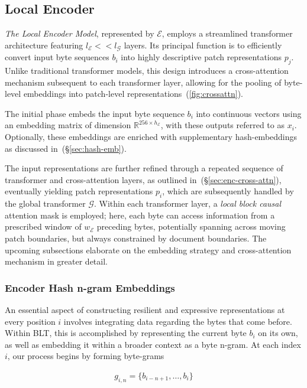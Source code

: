 \subsection{Local Encoder}
\label{section:local}

\textit{The Local Encoder Model}, represented by $\mathcal{E}$, employs a streamlined transformer architecture featuring $l_{\mathcal{E}} << l_{\mathcal{G}}$ layers. Its principal function is to efficiently convert input byte sequences $b_i$ into highly descriptive patch representations $p_j$. Unlike traditional transformer models, this design introduces a cross-attention mechanism subsequent to each transformer layer, allowing for the pooling of byte-level embeddings into patch-level representations~(\autoref{fig:crossattn}).

The initial phase embeds the input byte sequence $b_i$ into continuous vectors using an embedding matrix of dimension $\mathbb{R}^{256 \times h_{\mathcal{E}}}$, with these outputs referred to as $x_i$. Optionally, these embeddings are enriched with supplementary hash-embeddings as discussed in~(\S\ref{sec:hash-emb}). 

The input representations are further refined through a repeated sequence of transformer and cross-attention layers, as outlined in~(\S\ref{sec:enc-cross-attn}), eventually yielding patch representations $p_i$, which are subsequently handled by the global transformer $\mathcal{G}$. Within each transformer layer, a \textit{local block causal} attention mask is employed; here, each byte can access information from a prescribed window of $w_{\mathcal{E}}$ preceding bytes, potentially spanning across moving patch boundaries, but always constrained by document boundaries. The upcoming subsections elaborate on the embedding strategy and cross-attention mechanism in greater detail.

\subsubsection{Encoder Hash n-gram Embeddings}
\label{sec:ngram-emb}
\label{sec:hash-emb}
An essential aspect of constructing resilient and expressive representations at every position $i$ involves integrating data regarding the bytes that come before. Within {\textsc BLT}, this is accomplished by representing the current byte $b_i$ on its own, as well as embedding it within a broader context as a byte n-gram. At each index $i$, our process begins by forming byte-grams

\begin{align}
    g_{i,n}=\{b_{i-n + 1},\ldots, b_i\}
\end{align}

